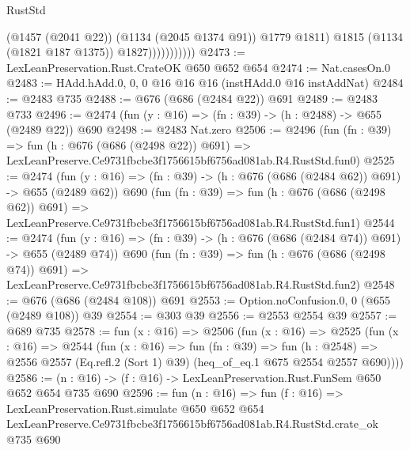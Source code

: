 \begin{lexlean}{RustStd}
\begin{coremodule}
                            (@1457 (@2041 @22))
                            (@1134 (@2045 @1374 @91))
                            @1779
                            @1811)
                          @1815
                          (@1134 (@1821 @187 @1375))
                          @1827)))))))))))
@2473 := LexLeanPreservation.Rust.CrateOK @650 @652 @654
@2474 := Nat.casesOn.{0}
@2483 := HAdd.hAdd.{0, 0, 0} @16 @16 @16 (instHAdd.{0} @16 instAddNat)
@2484 := @2483 @735
@2488 := @676 (@686 (@2484 @22)) @691
@2489 := @2483 @733
@2496 := @2474 (fun (y : @16) => (fn : @39) -> (h : @2488) -> @655 (@2489 @22)) @690
@2498 := @2483 Nat.zero
@2506 := @2496
    (fun (fn : @39) =>
    fun (h : @676 (@686 (@2498 @22)) @691) =>
    LexLeanPreserve.Ce9731fbcbe3f1756615bf6756ad081ab.R4.RustStd.fun0)
@2525 := @2474
    (fun (y : @16) => (fn : @39) -> (h : @676 (@686 (@2484 @62)) @691) -> @655 (@2489 @62))
    @690
    (fun (fn : @39) =>
    fun (h : @676 (@686 (@2498 @62)) @691) =>
    LexLeanPreserve.Ce9731fbcbe3f1756615bf6756ad081ab.R4.RustStd.fun1)
@2544 := @2474
    (fun (y : @16) => (fn : @39) -> (h : @676 (@686 (@2484 @74)) @691) -> @655 (@2489 @74))
    @690
    (fun (fn : @39) =>
    fun (h : @676 (@686 (@2498 @74)) @691) =>
    LexLeanPreserve.Ce9731fbcbe3f1756615bf6756ad081ab.R4.RustStd.fun2)
@2548 := @676 (@686 (@2484 @108)) @691
@2553 := Option.noConfusion.{0, 0} (@655 (@2489 @108)) @39
@2554 := @303 @39
@2556 := @2553 @2554 @39
@2557 := @689 @735
@2578 := fun (x : @16) =>
  @2506
    (fun (x : @16) =>
    @2525
      (fun (x : @16) =>
      @2544
        (fun (x : @16) =>
        fun (fn : @39) =>
        fun (h : @2548) =>
        @2556 @2557 (Eq.refl.{2} (Sort 1) @39) (heq_of_eq.{1} @675 @2554 @2557 @690))))
@2586 := (n : @16) -> (f : @16) -> LexLeanPreservation.Rust.FunSem @650 @652 @654 @735 @690
@2596 := fun (n : @16) =>
  fun (f : @16) =>
  LexLeanPreservation.Rust.simulate
    @650
    @652
    @654
    LexLeanPreserve.Ce9731fbcbe3f1756615bf6756ad081ab.R4.RustStd.crate_ok
    @735
    @690
\end{coremodule}
\end{lexlean}
